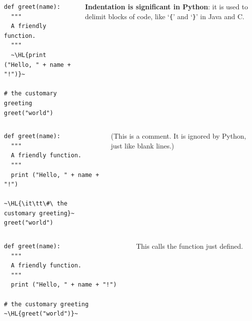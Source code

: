 \documentclass[english,serif,mathserif,xcolor=pdftex,dvipsnames,table]{beamer}
\begin{document}
\begin{frame}[fragile]
  \begin{columns}[t]
    \begin{column}{0.5\textwidth}
\begin{lstlisting}
def greet(name):
  """
  A friendly function.
  """
  ~\HL{print ("Hello, " + name + "!")}~

# the customary greeting
greet("world")
\end{lstlisting}
    \end{column}
    \begin{column}{0.5\textwidth}
      \raggedleft
      \textbf{Indentation is significant in Python}: it is used to delimit
      blocks of code, like `\texttt{\{}' and `\texttt{\}}' in Java and C.
    \end{column}
  \end{columns}
\end{frame}

\begin{frame}[fragile]
  \begin{columns}[t]
    \begin{column}{0.5\textwidth}
\begin{lstlisting}
def greet(name):
  """
  A friendly function.
  """
  print ("Hello, " + name + "!")

~\HL{\it\tt\#\ the customary greeting}~
greet("world")
\end{lstlisting}
    \end{column}
    \begin{column}{0.5\textwidth}
      \raggedleft
      (This is a comment. It is ignored by Python, just like blank lines.)
    \end{column}
  \end{columns}
\end{frame}

\begin{frame}[fragile]
  \begin{columns}[t]
    \begin{column}{0.5\textwidth}
\begin{lstlisting}
def greet(name):
  """
  A friendly function.
  """
  print ("Hello, " + name + "!")

# the customary greeting
~\HL{greet("world")}~
\end{lstlisting}
    \end{column}
    \begin{column}{0.5\textwidth}
      \raggedleft
      This calls the function just defined.
    \end{column}
  \end{columns}
\end{frame}
\end{document}
